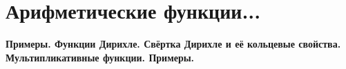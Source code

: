 \section{
	Арифметические функции...  %
}

\textbf{Примеры. Функции Дирихле. Свёртка Дирихле и её кольцевые свойства. Мультипликативные функции. Примеры.}
